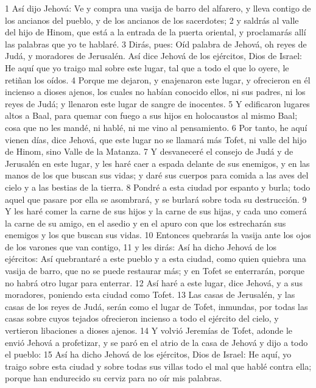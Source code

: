 1 Así dijo Jehová: Ve y compra una vasija de barro del alfarero, y lleva contigo de los ancianos del pueblo, y de los ancianos de los sacerdotes;
2 y saldrás al valle del hijo de Hinom, que está a la entrada de la puerta oriental, y proclamarás allí las palabras que yo te hablaré.
3 Dirás, pues: Oíd palabra de Jehová, oh reyes de Judá, y moradores de Jerusalén. Así dice Jehová de los ejércitos, Dios de Israel: He aquí que yo traigo mal sobre este lugar, tal que a todo el que lo oyere, le retiñan los oídos.
4 Porque me dejaron, y enajenaron este lugar, y ofrecieron en él incienso a dioses ajenos, los cuales no habían conocido ellos, ni sus padres, ni los reyes de Judá; y llenaron este lugar de sangre de inocentes.
5 Y edificaron lugares altos a Baal, para quemar con fuego a sus hijos en holocaustos al mismo Baal; cosa que no les mandé, ni hablé, ni me vino al pensamiento.
6 Por tanto, he aquí vienen días, dice Jehová, que este lugar no se llamará más Tofet, ni valle del hijo de Hinom, sino Valle de la Matanza.
7 Y desvaneceré el consejo de Judá y de Jerusalén en este lugar, y les haré caer a espada delante de sus enemigos, y en las manos de los que buscan sus vidas; y daré sus cuerpos para comida a las aves del cielo y a las bestias de la tierra.
8 Pondré a esta ciudad por espanto y burla; todo aquel que pasare por ella se asombrará, y se burlará sobre toda su destrucción.
9 Y les haré comer la carne de sus hijos y la carne de sus hijas, y cada uno comerá la carne de su amigo, en el asedio y en el apuro con que los estrecharán sus enemigos y los que buscan sus vidas.
10 Entonces quebrarás la vasija ante los ojos de los varones que van contigo,
11 y les dirás: Así ha dicho Jehová de los ejércitos: Así quebrantaré a este pueblo y a esta ciudad, como quien quiebra una vasija de barro, que no se puede restaurar más; y en Tofet se enterrarán, porque no habrá otro lugar para enterrar.
12 Así haré a este lugar, dice Jehová, y a sus moradores, poniendo esta ciudad como Tofet.
13 Las casas de Jerusalén, y las casas de los reyes de Judá, serán como el lugar de Tofet, inmundas, por todas las casas sobre cuyos tejados ofrecieron incienso a todo el ejército del cielo, y vertieron libaciones a dioses ajenos.
14 Y volvió Jeremías de Tofet, adonde le envió Jehová a profetizar, y se paró en el atrio de la casa de Jehová y dijo a todo el pueblo:
15 Así ha dicho Jehová de los ejércitos, Dios de Israel: He aquí, yo traigo sobre esta ciudad y sobre todas sus villas todo el mal que hablé contra ella; porque han endurecido su cerviz para no oír mis palabras.

